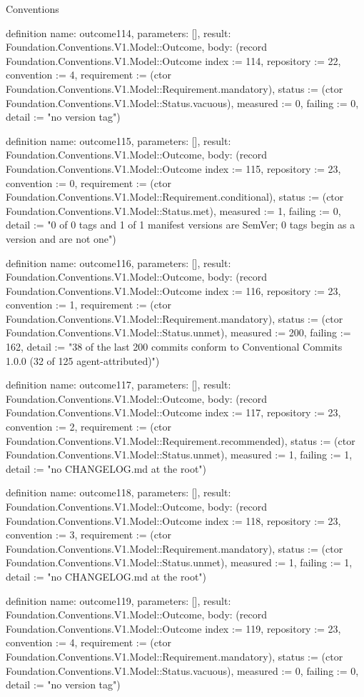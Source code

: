 \begin{lexlean}{Conventions}
\begin{semanticmodule}
definition{
  name: outcome114,
  parameters: [],
  result: Foundation.Conventions.V1.Model::Outcome,
  body: (record Foundation.Conventions.V1.Model::Outcome {index := 114, repository := 22, convention := 4, requirement := (ctor Foundation.Conventions.V1.Model::Requirement.mandatory), status := (ctor Foundation.Conventions.V1.Model::Status.vacuous), measured := 0, failing := 0, detail := "no version tag"})
}

definition{
  name: outcome115,
  parameters: [],
  result: Foundation.Conventions.V1.Model::Outcome,
  body: (record Foundation.Conventions.V1.Model::Outcome {index := 115, repository := 23, convention := 0, requirement := (ctor Foundation.Conventions.V1.Model::Requirement.conditional), status := (ctor Foundation.Conventions.V1.Model::Status.met), measured := 1, failing := 0, detail := "0 of 0 tags and 1 of 1 manifest versions are SemVer; 0 tags begin as a version and are not one"})
}

definition{
  name: outcome116,
  parameters: [],
  result: Foundation.Conventions.V1.Model::Outcome,
  body: (record Foundation.Conventions.V1.Model::Outcome {index := 116, repository := 23, convention := 1, requirement := (ctor Foundation.Conventions.V1.Model::Requirement.mandatory), status := (ctor Foundation.Conventions.V1.Model::Status.unmet), measured := 200, failing := 162, detail := "38 of the last 200 commits conform to Conventional Commits 1.0.0 (32 of 125 agent-attributed)"})
}

definition{
  name: outcome117,
  parameters: [],
  result: Foundation.Conventions.V1.Model::Outcome,
  body: (record Foundation.Conventions.V1.Model::Outcome {index := 117, repository := 23, convention := 2, requirement := (ctor Foundation.Conventions.V1.Model::Requirement.recommended), status := (ctor Foundation.Conventions.V1.Model::Status.unmet), measured := 1, failing := 1, detail := "no CHANGELOG.md at the root"})
}

definition{
  name: outcome118,
  parameters: [],
  result: Foundation.Conventions.V1.Model::Outcome,
  body: (record Foundation.Conventions.V1.Model::Outcome {index := 118, repository := 23, convention := 3, requirement := (ctor Foundation.Conventions.V1.Model::Requirement.mandatory), status := (ctor Foundation.Conventions.V1.Model::Status.unmet), measured := 1, failing := 1, detail := "no CHANGELOG.md at the root"})
}

definition{
  name: outcome119,
  parameters: [],
  result: Foundation.Conventions.V1.Model::Outcome,
  body: (record Foundation.Conventions.V1.Model::Outcome {index := 119, repository := 23, convention := 4, requirement := (ctor Foundation.Conventions.V1.Model::Requirement.mandatory), status := (ctor Foundation.Conventions.V1.Model::Status.vacuous), measured := 0, failing := 0, detail := "no version tag"})
}


\end{semanticmodule}
\end{lexlean}

